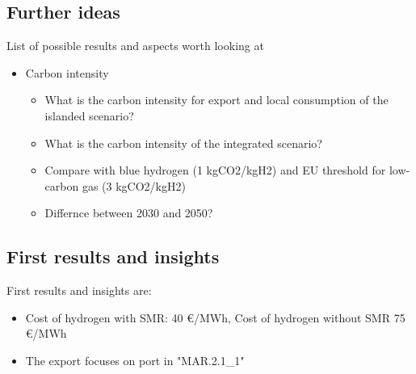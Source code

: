 \subsection{Further ideas}
List of possible results and aspects worth looking at
\begin{itemize}
    \item Carbon intensity
    \begin{itemize}
        \item What is the carbon intensity for export and local consumption of the islanded scenario? 
        \item What is the carbon intensity of the integrated scenario?
        \item Compare with blue hydrogen (1 kgCO2/kgH2) and EU threshold for low-carbon gas (3 kgCO2/kgH2)
        \item Differnce between 2030 and 2050?
    \end{itemize}
\end{itemize}



\subsection{First results and insights}

First results and insights are:
\begin{itemize}
    \item Cost of hydrogen with SMR: 40 €/MWh, Cost of hydrogen without SMR 75 €/MWh
    \item The export focuses on port in "MAR.2.1{\_}1"
\end{itemize}



